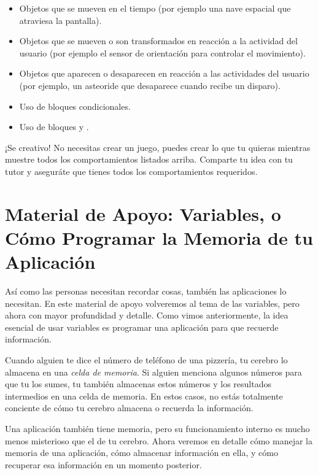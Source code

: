 \begin{itemize}

\item Objetos que se mueven en el tiempo (por ejemplo una nave
  espacial que atraviesa la pantalla).

\item Objetos que se mueven o son transformados en reacción a la
  actividad del usuario (por ejemplo el sensor de orientación para
  controlar el movimiento).

\item Objetos que aparecen o desaparecen en reacción a las actividades
  del usuario (por ejemplo, un asteoride que desaparece cuando recibe
  un disparo).

\item Uso de bloques condicionales.

\item Uso de bloques  y .

\end{itemize}

¡Se creativo! No necesitas crear un juego, puedes crear lo que tu
quieras mientras muestre todos los comportamientos listados arriba.
Comparte tu idea con tu tutor y aseguráte que tienes todos los
comportamientos requeridos.

\section{Material de Apoyo: Variables, o Cómo Programar la Memoria de
tu Aplicación}

Así como las personas necesitan recordar cosas, también las
aplicaciones lo necesitan. En este material de apoyo volveremos al
tema de las variables, pero ahora con mayor profundidad y
detalle. Como vimos anteriormente, la idea esencial de usar variables
es programar una aplicación para que recuerde información.

Cuando alguien te dice el número de teléfono de una pizzería, tu
cerebro lo almacena en una \emph{celda de memoria}. Si alguien
menciona algunos números para que tu los sumes, tu también almacenas
estos números y los resultados intermedios en una celda de memoria. En
estos casos, no estás totalmente conciente de cómo tu cerebro almacena
o recuerda la información.

Una aplicación también tiene memoria, pero su funcionamiento interno
es mucho menos misterioso que el de tu cerebro. Ahora veremos en
detalle cómo manejar la memoria de una aplicación, cómo almacenar
información en ella, y cómo recuperar esa información en un momento
posterior.

